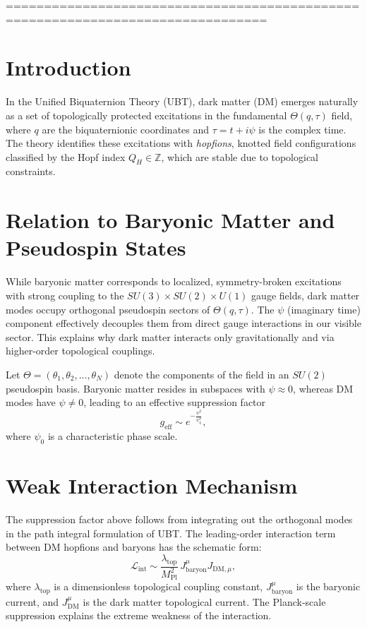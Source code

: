 ================================================================================

\section{Introduction}
In the Unified Biquaternion Theory (UBT), dark matter (DM) emerges naturally as a set of topologically protected excitations in the fundamental $\Theta(q,\tau)$ field, where $q$ are the biquaternionic coordinates and $\tau = t + i\psi$ is the complex time. The theory identifies these excitations with \emph{hopfions}, knotted field configurations classified by the Hopf index $Q_H \in \mathbb{Z}$, which are stable due to topological constraints.

\section{Relation to Baryonic Matter and Pseudospin States}
While baryonic matter corresponds to localized, symmetry-broken excitations with strong coupling to the $SU(3) \times SU(2) \times U(1)$ gauge fields, dark matter modes occupy orthogonal pseudospin sectors of $\Theta(q,\tau)$.
The $\psi$ (imaginary time) component effectively decouples them from direct gauge interactions in our visible sector. This explains why dark matter interacts only gravitationally and via higher-order topological couplings.

Let $\Theta = (\theta_1, \theta_2, ..., \theta_N)$ denote the components of the field in an $SU(2)$ pseudospin basis. Baryonic matter resides in subspaces with $\psi \approx 0$, whereas DM modes have $\psi \neq 0$, leading to an effective suppression factor
\begin{equation}
g_{\mathrm{eff}} \sim e^{-\frac{\psi^2}{\psi_0^2}},
\end{equation}
where $\psi_0$ is a characteristic phase scale.

\section{Weak Interaction Mechanism}
The suppression factor above follows from integrating out the orthogonal modes in the path integral formulation of UBT. The leading-order interaction term between DM hopfions and baryons has the schematic form:
\begin{equation}
\mathcal{L}_{\mathrm{int}} \sim \frac{\lambda_{\mathrm{top}}}{M_{\mathrm{Pl}}^2} \, J_{\mathrm{baryon}}^\mu J_{\mathrm{DM},\mu},
\end{equation}
where $\lambda_{\mathrm{top}}$ is a dimensionless topological coupling constant, $J_{\mathrm{baryon}}^\mu$ is the baryonic current, and $J_{\mathrm{DM}}^\mu$ is the dark matter topological current. The Planck-scale suppression explains the extreme weakness of the interaction.


